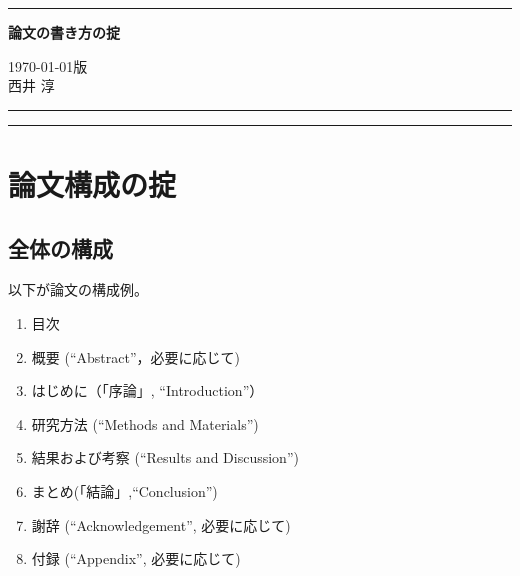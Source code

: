 \documentclass[12pt, ]{jsarticle}
\providecommand{\tightlist}{%
   \setlength{\itemsep}{0pt}\setlength{\parskip}{0pt}}
\begin{document}
\renewcommand{\lstlistingname}{リスト}
\newcommand{\passthrough}[1]{#1}



\noindent
\rule{\linewidth}{0.3pt}
\begin{center}
  \textbf{\LARGE 論文の書き方の掟}
\end{center}
\begin{flushright}
\today 版\\
西井 淳
\end{flushright}
\rule{\linewidth}{0.3pt}
    {\small
  \begin{quote}
        \hypersetup{linkcolor=black}
      \setcounter{tocdepth}{3}
      \tableofcontents
    \end{quote}}
          \rule{\linewidth}{0.3pt}
      

\hypertarget{ux8ad6ux6587ux69cbux6210ux306eux639f}{%
\section{論文構成の掟}\label{ux8ad6ux6587ux69cbux6210ux306eux639f}}

\hypertarget{ux5168ux4f53ux306eux69cbux6210}{%
\subsection{全体の構成}\label{ux5168ux4f53ux306eux69cbux6210}}

以下が論文の構成例。

\begin{enumerate}
\tightlist
\item
  目次
\item
  概要 (``Abstract''，必要に応じて)
\item
  はじめに（「序論」, ``Introduction''）
\item
  研究方法 (``Methods and Materials'')
\item
  結果および考察 (``Results and Discussion'')
\item
  まとめ(「結論」,``Conclusion'')
\item
  謝辞 (``Acknowledgement'', 必要に応じて)
\item
  付録 (``Appendix'', 必要に応じて)
\end{enumerate}
\end{document}
